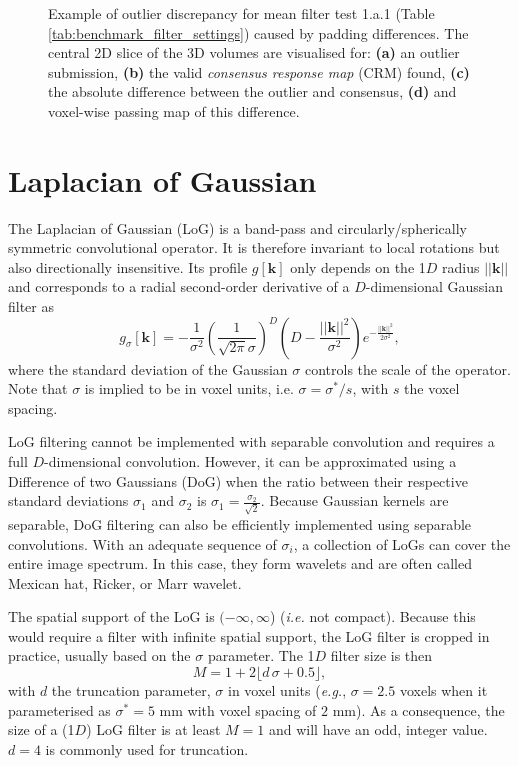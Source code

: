 \documentclass[fleqn,a4paper,oneside,openany]{book}
\begin{document}
\begin{figure}[!t]
\begin{minipage}[b]{0.45\textwidth}
   \end{minipage} 
   \caption{Example of outlier discrepancy for mean filter test 1.a.1 (Table \ref{tab:benchmark_filter_settings}) caused by padding differences. The central 2D slice of the 3D volumes are visualised for: \textbf{(a)} an outlier submission, \textbf{(b)} the valid \textit{consensus response map} (CRM) found, \textbf{(c)} the absolute difference between the outlier and consensus,  \textbf{(d)} and voxel-wise passing map of this difference. }
   \label{fig:1a1_mean_example}
\end{figure}



\section{Laplacian of Gaussian}\label{sec:LaplacianOfGaussian}
%
The Laplacian of Gaussian (LoG) is a band-pass and circularly/spherically symmetric convolutional operator.
It is therefore invariant to local rotations but also directionally insensitive.
Its profile $g[\boldsymbol{k}]$ only depends on the 1$D$ radius $||\boldsymbol{k}||$ and corresponds to a radial second-order derivative of a $D$-dimensional Gaussian filter as
%
\begin{equation}\label{eq:LoG}
g_{\sigma}[\boldsymbol{k}]=
-\frac{1}{\sigma^2}
\left(\frac{1}{\sqrt{2\pi}\sigma}\right)^D
\left(D-\frac{||\boldsymbol{k}||^2}{\sigma^2}\right)
e^{-\frac{||\boldsymbol{k}||^2}{2\sigma^2}},
\end{equation}
%
where the standard deviation of the Gaussian $\sigma$ controls the scale of the operator. Note that \(\sigma\) is implied to be in voxel units, i.e. $\sigma = \sigma^* / s$, with $s$ the voxel spacing.

LoG filtering cannot be implemented with separable convolution and requires a full $D$-dimensional convolution.
However, it can be approximated using a Difference of two Gaussians (DoG) when the ratio between their respective standard deviations $\sigma_1$ and $\sigma_2$ is $\sigma_1 = \frac{\sigma_2}{\sqrt{2}}$.
Because Gaussian kernels are separable, DoG filtering can also be efficiently implemented using separable convolutions.
With an adequate sequence of $\sigma_i$, a collection of LoGs can cover the entire image spectrum. In this case, they form wavelets and are often called Mexican hat, Ricker, or Marr wavelet.
%

The spatial support of the LoG is \((-\infty, \infty\)) (\emph{i.e.} not compact). 
Because this would require a filter with infinite spatial support, the LoG filter is cropped in practice, usually based on the $\sigma$ parameter. The 1$D$ filter size is then
$$M=1 + 2\lfloor d\, \sigma + 0.5\rfloor,$$
with \(d\) the truncation parameter, \(\sigma\)  in voxel units (\emph{e.g.}, \(\sigma=2.5\) voxels when it parameterised as \(\sigma^* = 5\) mm with voxel spacing of \(2\) mm). As a consequence, the size of a (1$D$) LoG filter is at least \(M=1\) and will have an odd, integer value. \(d=4\) is commonly used for truncation.
\end{document}
